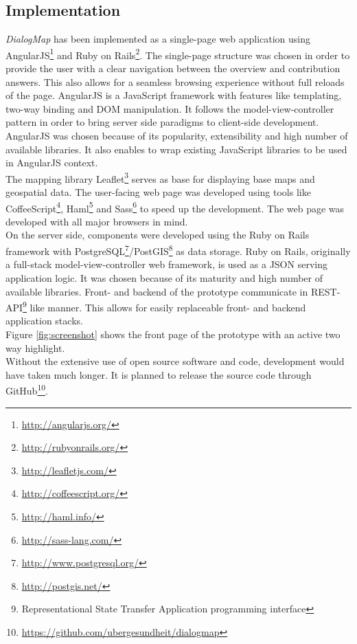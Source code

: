 \subsection{Implementation}
\label{sub:implementation}
\textit{DialogMap} has been implemented as a single-page web application using AngularJS\footnote{\url{http://angularjs.org/}} and Ruby on Rails\footnote{\url{http://rubyonrails.org/}}. The single-page structure was chosen in order to provide the user with a clear navigation between the overview and contribution answers. This also allows for a seamless browsing experience without full reloads of the page. AngularJS is a JavaScript framework with features like templating, two-way binding and DOM manipulation. It follows the model-view-controller pattern in order to bring server side paradigms to client-side development. AngularJS was chosen because of its popularity, extensibility and high number of available libraries. It also enables to wrap existing JavaScript libraries to be used in AngularJS context.\\
The mapping library Leaflet\footnote{\url{http://leafletjs.com/}} serves as base for displaying base maps and geospatial data. The user-facing web page was developed using tools like CoffeeScript\footnote{\url{http://coffeescript.org/}}, Haml\footnote{\url{http://haml.info/}} and Sass\footnote{\url{http://sass-lang.com/}} to speed up the development. The web page was developed with all major browsers in mind.\\
On the server side, components were developed using the Ruby on Rails framework with PostgreSQL\footnote{\url{http://www.postgresql.org/}}/PostGIS\footnote{\url{http://postgis.net/}} as data storage. Ruby on Rails, originally a full-stack model-view-controller web framework, is used as a JSON serving application logic. It was chosen because of its maturity and high number of available libraries. Front- and backend of the prototype communicate in REST-API\footnote{Representational State Transfer Application programming interface} like manner. This allows for easily replaceable front- and backend application stacks.\\
Figure \ref{fig:screenshot} shows the front page of the prototype with an active two way highlight.\\
Without the extensive use of open source software and code, development would have taken much longer. It is planned to release the source code through GitHub\footnote{\url{https://github.com/ubergesundheit/dialogmap}}.

